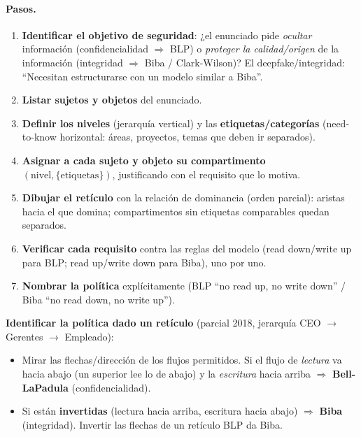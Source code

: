 \documentclass[../main.tex]{subfiles}
\begin{document}
\paragraph{Pasos.}
\begin{enumerate}[nosep]
  \item \textbf{Identificar el objetivo de seguridad}: ¿el enunciado pide \emph{ocultar} información (confidencialidad $\Rightarrow$ BLP) o \emph{proteger la calidad/origen} de la información (integridad $\Rightarrow$ Biba / Clark-Wilson)? El deepfake/integridad: ``Necesitan estructurarse con un modelo similar a Biba''.
  \item \textbf{Listar sujetos y objetos} del enunciado.
  \item \textbf{Definir los niveles} (jerarquía vertical) y las \textbf{etiquetas/categorías} (need-to-know horizontal: áreas, proyectos, temas que deben ir separados).
  \item \textbf{Asignar a cada sujeto y objeto su compartimento} $(\text{nivel},\{\text{etiquetas}\})$, justificando con el requisito que lo motiva.
  \item \textbf{Dibujar el retículo} con la relación de dominancia (orden parcial): aristas hacia el que domina; compartimentos sin etiquetas comparables quedan separados.
  \item \textbf{Verificar cada requisito} contra las reglas del modelo (read down/write up para BLP; read up/write down para Biba), uno por uno.
  \item \textbf{Nombrar la política} explícitamente (BLP ``no read up, no write down'' / Biba ``no read down, no write up'').
\end{enumerate}

\begin{examen}
\textbf{Identificar la política dado un retículo} (parcial 2018, jerarquía CEO $\to$ Gerentes $\to$ Empleado):
\begin{itemize}[nosep]
  \item Mirar las flechas/dirección de los flujos permitidos. Si el flujo de \emph{lectura} va hacia abajo (un superior lee lo de abajo) y la \emph{escritura} hacia arriba $\Rightarrow$ \textbf{Bell-LaPadula} (confidencialidad).
  \item Si están \textbf{invertidas} (lectura hacia arriba, escritura hacia abajo) $\Rightarrow$ \textbf{Biba} (integridad). Invertir las flechas de un retículo BLP da Biba.
\end{itemize}
\end{examen}
\end{document}
